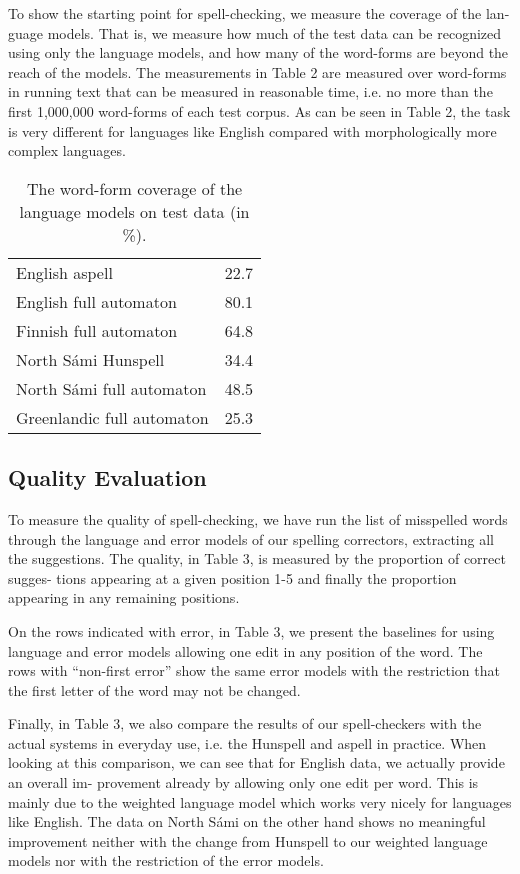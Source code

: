 \documentclass[postprint]{flammie}
\begin{document}
To show the starting point for spell-checking, we measure the coverage of the
lan- guage models. That is, we measure how much of the test data can be
recognized using only the language models, and how many of the word-forms are
beyond the reach of the models. The measurements in Table 2 are measured over
word-forms in running text that can be measured in reasonable time, i.e. no
more than the first 1,000,000 word-forms of each test corpus. As can be seen in
Table 2, the task is very different for languages like English compared with
morphologically more complex languages.

\begin{table}
    \caption{The word-form coverage of the language models on test data (in \%).}
        \begin{tabular}{lr}
            English aspell & 22.7 \\
            English full automaton & 80.1 \\
            Finnish full automaton & 64.8 \\
            North Sámi Hunspell & 34.4 \\
            North Sámi full automaton & 48.5 \\
            Greenlandic full automaton & 25.3 \\
        \end{tabular}
\end{table}

\subsection{Quality Evaluation}

To measure the quality of spell-checking, we have run the list of misspelled
words through the language and error models of our spelling correctors,
extracting all the suggestions. The quality, in Table 3, is measured by the
proportion of correct sugges- tions appearing at a given position 1-5 and
finally the proportion appearing in any remaining positions.

On the rows indicated with error, in Table 3, we present the baselines for
using language and error models allowing one edit in any position of the word.
The rows with “non-first error” show the same error models with the restriction
that the first letter of the word may not be changed.

Finally, in Table 3, we also compare the results of our spell-checkers with the
actual systems in everyday use, i.e. the Hunspell and aspell in practice.
When looking at this comparison, we can see that for English data, we actually
provide an overall im- provement already by allowing only one edit per word.
This is mainly due to the weighted language model which works very nicely for
languages like English. The data on North Sámi on the other hand shows no
meaningful improvement neither with the change from Hunspell to our weighted
language models nor with the restriction of the error models.
\end{document}
